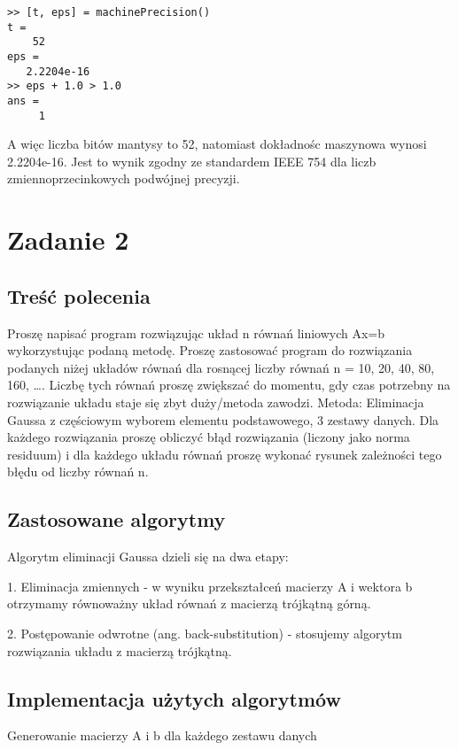 \documentclass[11pt]{article} %
\begin{document}
\begin{verbatim}
>> [t, eps] = machinePrecision()
t =
    52
eps =
   2.2204e-16
>> eps + 1.0 > 1.0
ans =
     1
\end{verbatim}
A więc liczba bitów mantysy to 52, natomiast dokładnośc maszynowa wynosi 2.2204e-16. Jest to wynik zgodny ze standardem IEEE 754 dla liczb zmiennoprzecinkowych podwójnej precyzji.

\section{Zadanie 2}

\subsection{Treść polecenia}

Proszę napisać program rozwiązując układ n równań liniowych Ax=b wykorzystując podaną metodę. Proszę zastosować program do rozwiązania podanych niżej układów równań dla rosnącej liczby równań n = 10, 20, 40, 80, 160, …. Liczbę tych równań proszę zwiększać do momentu, gdy czas potrzebny na rozwiązanie układu staje się zbyt duży/metoda zawodzi.
Metoda: Eliminacja Gaussa z częściowym wyborem elementu podstawowego, 3 zestawy danych.
Dla każdego rozwiązania proszę obliczyć błąd rozwiązania (liczony jako norma residuum) i dla każdego układu równań proszę wykonać rysunek zależności tego błędu od liczby równań n.

\subsection{Zastosowane algorytmy}
Algorytm eliminacji Gaussa dzieli się na dwa etapy:

1. Eliminacja zmiennych - w wyniku przekształceń macierzy A i wektora b otrzymamy równoważny układ równań z macierzą trójkątną górną.

2. Postępowanie odwrotne (ang. back-substitution) - stosujemy algorytm rozwiązania układu z macierzą trójkątną.

\subsection{Implementacja użytych algorytmów}

Generowanie macierzy A i b dla każdego zestawu danych
\end{document}
